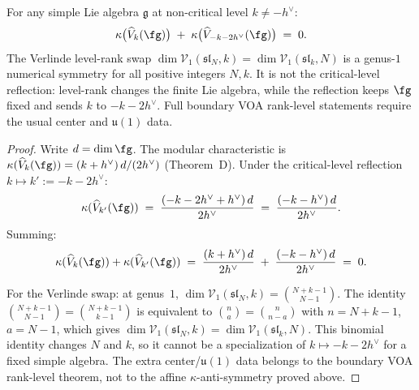 \begin{proposition}
\label{prop:kappa-anti-symmetry-ff}
\ClaimStatusProvedHere
{}
For any simple Lie algebra $\mathfrak{g}$ at non-critical level
$k \neq -h^\vee$:
\begin{equation}\label{eq:kappa-ff-antisymmetry}
 \kappa\bigl(\widehat{V}_k(\fg)\bigr)
 \;+\;
 \kappa\bigl(\widehat{V}_{-k-2h^\vee}(\fg)\bigr)
 \;=\; 0.
\end{equation}
The Verlinde level-rank swap
$\dim \mathcal{V}_1(\mathfrak{sl}_N, k)
= \dim \mathcal{V}_1(\mathfrak{sl}_k, N)$
is a genus-$1$ numerical symmetry for all positive integers \(N,k\).
It is not the critical-level reflection: level-rank changes the
finite Lie algebra, while the reflection keeps \(\fg\) fixed and
sends \(k\) to \(-k-2h^\vee\). Full boundary VOA rank-level
statements require the usual center and \(\mathfrak u(1)\) data.
\end{proposition}

\begin{proof}
Write $d = \dim\fg$. The modular characteristic is
$\kappa(\widehat{V}_k(\fg)) = (k + h^\vee)\,d/(2h^\vee)$
\textup{(}Theorem~D\textup{)}.
Under the critical-level reflection
$k \mapsto k' := -k - 2h^\vee$:
\[
 \kappa(\widehat{V}_{k'}(\fg))
 \;=\;
 \frac{(-k - 2h^\vee + h^\vee)\,d}{2h^\vee}
 \;=\;
 \frac{(-k - h^\vee)\,d}{2h^\vee}.
\]
Summing:
\[
 \kappa(\widehat{V}_k(\fg)) + \kappa(\widehat{V}_{k'}(\fg))
 \;=\;
 \frac{(k + h^\vee)\,d}{2h^\vee}
 \;+\;
 \frac{(-k - h^\vee)\,d}{2h^\vee}
 \;=\; 0.
\]

For the Verlinde swap: at genus~$1$,
$\dim\mathcal{V}_1(\mathfrak{sl}_N, k) = \binom{N+k-1}{N-1}$.
The identity $\binom{N+k-1}{N-1} = \binom{N+k-1}{k-1}$ is equivalent
to $\binom{n}{a} = \binom{n}{n-a}$ with $n = N+k-1$, $a = N-1$,
which gives $\dim\mathcal{V}_1(\mathfrak{sl}_N, k)
= \dim\mathcal{V}_1(\mathfrak{sl}_k, N)$. This binomial identity
changes \(N\) and \(k\), so it cannot be a specialization of
\(k\mapsto -k-2h^\vee\) for a fixed simple algebra. The extra
center/\(\mathfrak u(1)\) data belongs to the boundary VOA
rank-level theorem, not to the affine \(\kappa\)-anti-symmetry
proved above.
\end{proof}

